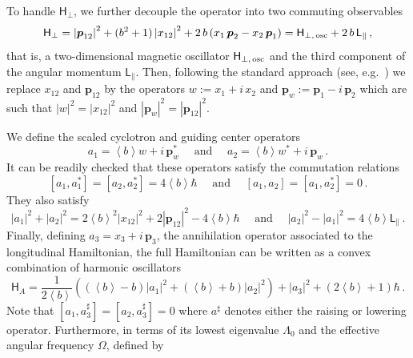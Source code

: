 \documentclass[11pt]{amsart}
\theoremstyle{plain}
\theoremstyle{definition}
\newcommand		\sfH		{\mathsf H}			%
\newcommand		\sfL		{\mathsf L}			%
\newcommand		{\lt}			{\left}				%
\newcommand		{\rt}			{\right}			%
\renewcommand	{\(}			{\lt(}
\renewcommand	{\)}			{\rt)}
\newcommand		{\bangle}[1]	{\lt\langle #1\rt\rangle}
\newcommand		{\weight}[1]	{\bangle{#1}}	%
\newcommand		{\com}[1]		{\lt[{#1}\rt]}		%
\newcommand		{\n}[1]			{\lt\lvert #1 \rt\rvert}
\newcommand		{\opp}		{\boldsymbol{p}}
\begin{document}
	To handle $\sfH_{\perp}$, we further decouple the operator into two commuting observables
	\begin{equation*}
		\sfH_{\perp} = \n{\opp_{12}}^2+ (b^2+1)\n{x_{12}}^2+ 2\,b \lt(x_1\,\opp_2-x_2\,\opp_1\rt) = \sfH_{\perp,\, \textnormal{osc}} + 2\,b\,\sfL_{\parallel}\,,
	\end{equation*}
    that is, a two-dimensional magnetic oscillator $\sfH_{\perp,\, \textnormal{osc}}$ and the third component of the angular momentum $\sfL_{\parallel}$. Then, following the standard approach (see, e.g.~\cite{aftalion_vortex_2005, rougerie_quantum_2022}) we replace $x_{12}$ and $\opp_{12}$ by the operators $w := x_1+i\, x_2$ and $\opp_w := \opp_1-i\,\opp_2$ which are such that $\n{w}^2=\n{x_{12}}^2$ and $\n{\opp_w}^2=\n{\opp_{12}}^2$.

	We define the scaled cyclotron and guiding center operators
	\begin{equation*}
		a_1 = \weight{b} w + i \,\opp_w^* \quad \text{ and } \quad a_2 = \weight{b} w^* + i \,\opp_w \,.
	\end{equation*}
	It can be readily checked that these operators satisfy the commutation relations
	\begin{equation}\label{eq:magn_comm_relations}
		\com{a_1, a_1^*} = \com{a_2, a_2^*} = 4\weight{b}\hbar \quad \text{ and } \quad \com{a_1, a_2} = \com{a_1, a_2^*} = 0 \, .
	\end{equation}
	They also satisfy
	\begin{equation*}
		\n{a_1}^2 + \n{a_2}^2 = 2\weight{b}^2\n{x_{12}}^2 + 2\n{\opp_{12}}^2 - 4\weight{b}\hbar \quad \text{ and } \quad \n{a_2}^2 - \n{a_1}^2 = 4 \weight{b} \sfL_{\parallel} \, .
	\end{equation*}
	Finally, defining $a_3 = x_3 + i\,\opp_3$, the annihilation operator associated to the longitudinal Hamiltonian, the full Hamiltonian can be written as a convex combination of harmonic oscillators
	\begin{equation*}
		\sfH_A = \frac{1}{2 \weight{b}}\lt(\lt(\weight{b}-b\rt)\n{a_1}^2 + \lt(\weight{b}+b\rt) \n{a_2}^2\rt) + \n{a_3}^2 + \lt(2 \weight{b}+1\rt)\hbar \, .
	\end{equation*}
	Note that $[a_1, a^\sharp_3]=[a_2, a^\sharp_3]=0$ where $a^\sharp$ denotes either the raising or lowering operator. Furthermore, in terms of its lowest eigenvalue $\Lambda_0$ and the effective angular frequency $\Omega$, defined by
\end{document}
